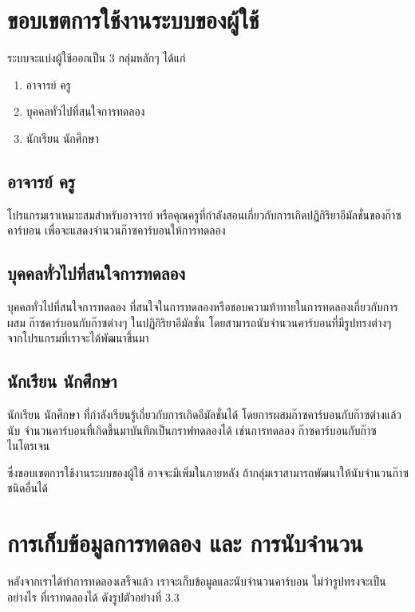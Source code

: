 \section{ขอบเขตการใช้งานระบบของผู้ใช้}

ระบบจะแบ่งผู้ใช้ออกเป็น 3 กลุ่มหลักๆ ได้แก่

\begin{enumerate}
  \item {อาจารย์ ครู}
  \item {บุคคลทั่วไปที่สนใจการทดลอง}
  \item {นักเรียน นักศึกษา}
\end{enumerate}

\subsection{อาจารย์ ครู}

\hspace{0.5 cm}โปรแกรมเราเหมาะสมสำหรับอาจารย์ หรือคุณครูที่กำลังสอนเกี่ยวกับการเกิดปฏิกิริยาอีมัลชั่นของก๊าซ \newline
คาร์บอน เพื่อจะแสดงจำนวนก๊าซคาร์บอนให้การทดลอง

\subsection{บุคคลทั่วไปที่สนใจการทดลอง}

\hspace{0.5 cm}บุคคลทั่วไปที่สนใจการทดลอง ที่สนใจในการทดลองหรือชอบความท้าทายในการทดลองเกี่ยวกับการผสม 
ก๊าซคาร์บอนกับก๊าซต่างๆ ในปฏิกิริยาอีมัลชั่น โดยสามารถนับจำนวนคาร์บอนที่มีรูปทรงต่างๆ จากโปรแกรมที่เราจะได้พัฒนาขึ้นมา

\subsection{นักเรียน นักศึกษา}

\hspace{0.5 cm}นักเรียน นักศึกษา ที่กำลังเรียนรู้เกี่ยวกับการเกิดอีมัลชั่นได้ โดยการผสมก๊าซคาร์บอนกับก๊าซต่างแล้วนับ จำนวนคาร์บอนที่เกิดขึ้นมาบันทึกเป็นกราฟทดลองได้ เช่นการทดลอง ก๊าซคาร์บอนกับก๊าซไนโตรเจน

ซึ่งขอบเขตการใช้งานระบบของผู้ใช้ อาจจะมีเพิ่มในภายหลัง ถ้ากลุ่มเราสามารถพัฒนาให้นับจำนวนก๊าซชนิดอื่นได้

\section{การเก็บข้อมูลการทดลอง และ การนับจำนวน}
หลังจากเราได้ทำการทดลองเสร็จแล้ว เราจะเก็บข้อมูลและนับจำนวนคาร์บอน ไม่ว่ารูปทรงจะเป็นอย่างไร \newline
ที่เราทดลองได้ ดังรูปตัวอย่างที่ 3.3

